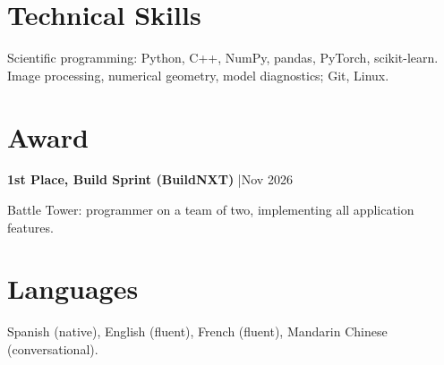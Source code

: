 \documentclass[11pt,a4paper]{article}
\begin{document}
\section{Technical Skills}
Scientific programming: Python, C++, NumPy, pandas, PyTorch, scikit-learn.\\[2pt]
Image processing, numerical geometry, model diagnostics; Git, Linux.
\section{Award}
\textbf{1st Place, Build Sprint (BuildNXT)} \enspace|\enspace Nov 2026\par
Battle Tower: programmer on a team of two, implementing all application features.
\section{Languages}
Spanish (native), English (fluent), French (fluent), Mandarin Chinese (conversational).
\end{document}
